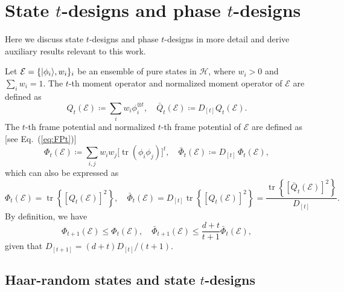 \documentclass[aps,pra,twocolumn,nofootinbib,superscriptaddress,10pt]{revtex4-2}
\DeclarePairedDelimiter{\ket}{\lvert}{\rangle}
\DeclareMathOperator{\tr}{tr}
\newcommand{\caE}{\mathcal{E}}
\newcommand{\caH}{\mathcal{H}}
\newcommand{\bQ}{\bar{Q}}
\newcommand{\bPhi}{\bar{\Phi}}
\newcommand{\eref}[1]{Eq.~\textup{(\ref{#1})}}
\begin{document}
\section{\texorpdfstring{State $t$-designs and phase $t$-designs}{State t-designs and phase t-designs}} \label{sup:tDesignPhaseDesign}

Here we discuss state $t$-designs and phase $t$-designs in more detail and derive auxiliary results relevant to this work.

Let $\caE = \{\ket{\phi_i}, w_i\}_{i}$ be an ensemble of pure states in $\caH$, where  $w_i>0$ and $\sum_i w_i=1$. The $t$-th moment operator and normalized moment operator of $\caE$ are defined as
\begin{equation}
Q_t(\caE)\coloneqq\sum_i  w_i\phi_i^{\otimes t}, \quad \bQ_t(\caE)\coloneqq D_{[t]}Q_t(\caE).
\end{equation}
The $t$-th frame potential and normalized $t$-th frame potential of $\caE$ are defined as [see \eref{eq:FPt}]
\begin{equation}\label{eq:FPtSupp}
\Phi_t(\caE) \coloneqq \sum_{i,j} w_i w_j \bigl[\tr(\phi_i\phi_j)\bigr]^t,\quad \bPhi_t(\caE) \coloneqq D_{[t]}\,\Phi_t(\caE),
\end{equation}
which can also be expressed as
\begin{equation}
\Phi_t(\caE)=\tr\left\{[Q_t(\caE)]^2\right\},\quad \bPhi_t(\caE)=D_{[t]}\tr\left\{[Q_t(\caE)]^2\right\}=\frac{\tr\left\{[\bQ_t(\caE)]^2\right\}}{D_{[t]}}.
\end{equation}
By definition, we have
\begin{equation} \label{eq:Phittp1}
   \Phi_{t+1}(\caE) \leq \Phi_t(\caE),\quad \bPhi_{t+1}(\caE)\leq \frac{d+t}{t+1} \bPhi_t(\caE),
\end{equation}
given that $D_{[t+1]}=(d+t)D_{[t]}/(t+1)$.


\subsection{\texorpdfstring{Haar-random states and state $t$-designs}{Haar-random states and state t-designs}}
\end{document}
